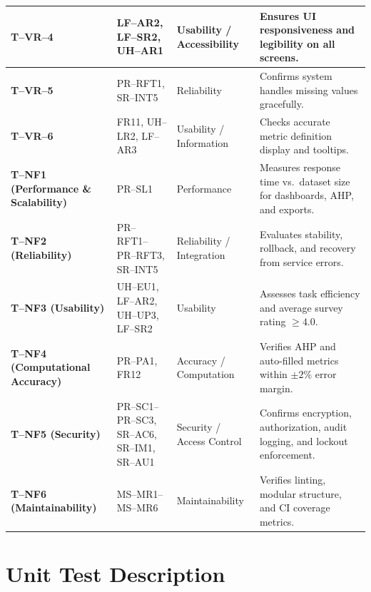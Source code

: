 \documentclass[12pt, titlepage]{article}
\begin{document}
\begin{longtable}{|p{}|p{}|p{}|p{}|}
\hline
\textbf{T--VR--4} & LF--AR2, LF--SR2, UH--AR1 & Usability / Accessibility & Ensures UI responsiveness and legibility on all screens. \\
\hline
\textbf{T--VR--5} & PR--RFT1, SR--INT5 & Reliability & Confirms system handles missing values gracefully. \\
\hline
\textbf{T--VR--6} & FR11, UH--LR2, LF--AR3 & Usability / Information & Checks accurate metric definition display and tooltips. \\
\hline
\textbf{T--NF1 (Performance \& Scalability)} & PR--SL1 & Performance & Measures response time vs.\ dataset size for dashboards, AHP, and exports. \\
\hline
\textbf{T--NF2 (Reliability)} & PR--RFT1--PR--RFT3, SR--INT5 & Reliability / Integration & Evaluates stability, rollback, and recovery from service errors. \\
\hline
\textbf{T--NF3 (Usability)} & UH--EU1, LF--AR2, UH--UP3, LF--SR2 & Usability & Assesses task efficiency and average survey rating $\geq 4.0$. \\
\hline
\textbf{T--NF4 (Computational Accuracy)} & PR--PA1, FR12 & Accuracy / Computation & Verifies AHP and auto-filled metrics within $\pm2$\% error margin. \\
\hline
\textbf{T--NF5 (Security)} & PR--SC1--PR--SC3, SR--AC6, SR--IM1, SR--AU1 & Security / Access Control & Confirms encryption, authorization, audit logging, and lockout enforcement. \\
\hline
\textbf{T--NF6 (Maintainability)} & MS--MR1--MS--MR6 & Maintainability & Verifies linting, modular structure, and CI coverage metrics. \\
\hline

\end{longtable}


\section{Unit Test Description}


\end{document}
